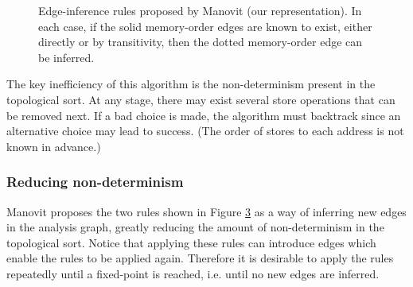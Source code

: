 \documentclass[11pt]{article}
\begin{document}
\begin{figure}[p]
\centering
\begin{subfigure}{.5\textwidth}
  \centering
{}
  \caption{}
  \label{Fig:Infer1}
\end{subfigure}%
\begin{subfigure}{.5\textwidth}
  \centering
{}
  \caption{}
  \label{Fig:Infer2}
\end{subfigure}
\caption{Edge-inference rules proposed by
Manovit \cite{Manovit} (our representation).  In
each case, if the solid memory-order edges are known to exist,
either directly or
by transitivity, then the dotted memory-order edge can be inferred.}
\label{Fig:InferRules}
\end{figure}

The key inefficiency of this algorithm is the non-determinism present
in the topological sort.  At any stage, there may exist several store
operations that can be removed next.  If a bad choice is made, the
algorithm must backtrack since an alternative choice may lead to
success.  (The order of stores to each address is not known in
advance.)

\subsubsection*{Reducing non-determinism}

Manovit proposes the two rules shown in Figure \ref{Fig:InferRules} as
a way of inferring new edges in the analysis graph, greatly
reducing the amount of non-determinism in the topological sort.
Notice that applying these rules can introduce edges which enable the
rules to be applied again.  Therefore it is desirable to apply the
rules repeatedly until a fixed-point is reached, i.e. until no new
edges are inferred.
\end{document}
